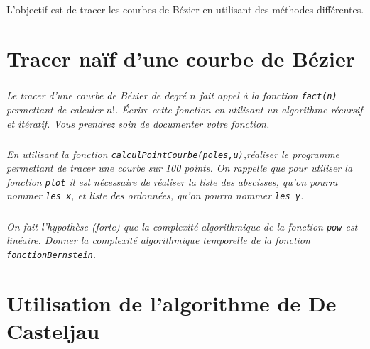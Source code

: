 \documentclass[10pt,fleqn]{article} %
\begin{document}
\begin{obj}
L'objectif est de tracer les courbes de Bézier en utilisant des méthodes différentes.
\end{obj}

\section{Tracer naïf d'une courbe de Bézier}

\subparagraph{}
\textit{Le tracer d'une courbe de Bézier de degré $n$ fait appel à la fonction \texttt{fact(n)} permettant de calculer $n!$. Écrire cette fonction en utilisant un algorithme récursif et itératif. Vous prendrez soin de documenter votre fonction.}

\subparagraph{}
\textit{En utilisant la fonction \texttt{calculPointCourbe(poles,u)},réaliser le programme permettant de tracer une courbe sur 100 points. On rappelle que pour utiliser la fonction \texttt{plot} il est nécessaire de réaliser la liste des abscisses, qu'on pourra nommer \texttt{les\_x}, et liste des ordonnées, qu'on pourra nommer \texttt{les\_y}. }


\subparagraph{}
\textit{On fait l'hypothèse (forte) que la complexité algorithmique de la fonction \texttt{pow} est linéaire. Donner la complexité algorithmique temporelle de la fonction \texttt{fonctionBernstein}.}


\section{Utilisation de l'algorithme de De Casteljau}
\end{document}
